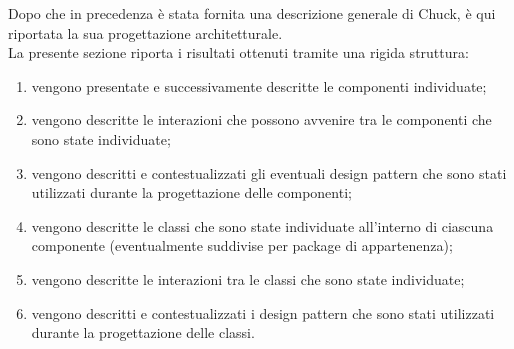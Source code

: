 	Dopo che in precedenza è stata fornita una descrizione generale di Chuck, è qui riportata la sua progettazione architetturale.\\
	La presente sezione riporta i risultati ottenuti tramite una rigida struttura:
	\begin{enumerate}
		\item vengono presentate e successivamente descritte le componenti individuate;
		\item vengono descritte le interazioni che possono avvenire tra le componenti che sono state individuate;
		\item vengono descritti e contestualizzati gli eventuali design pattern che sono stati utilizzati durante la progettazione delle componenti;
		\item vengono descritte le classi che sono state individuate all'interno di ciascuna componente (eventualmente suddivise per package di appartenenza);
		\item vengono descritte le interazioni tra le classi che sono state individuate;
		\item vengono descritti e contestualizzati i design pattern che sono stati utilizzati durante la progettazione delle classi.
	\end{enumerate}
	
